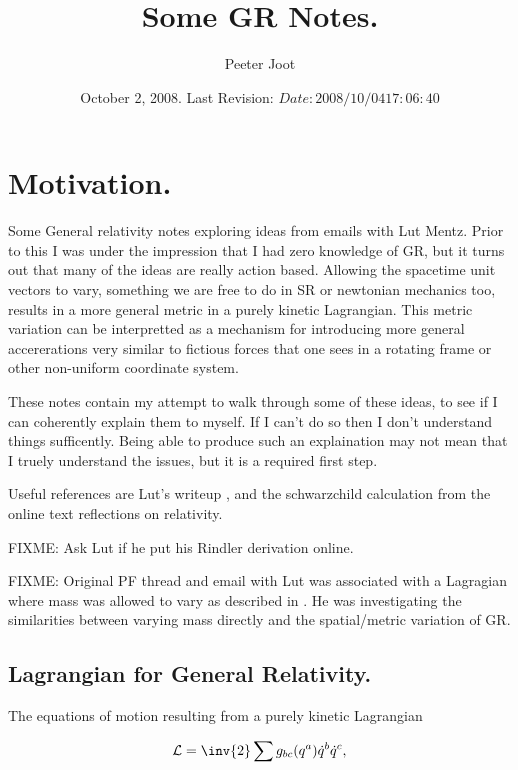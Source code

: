 \documentclass{article}      %
\title{ Some GR Notes. } %
\author{Peeter Joot}         %
\date{ October 2, 2008.  Last Revision: $Date: 2008/10/04 17:06:40 $ } %
\newcommand{\LL}[0]{\mathcal{L}}
\newcommand{\qdot}[0]{\dot{q}}
\begin{document}

\maketitle{}

\tableofcontents

\section{ Motivation. }

Some General relativity notes exploring ideas from emails with Lut Mentz.
Prior to this I was under the impression that I had zero knowledge of GR,
but it turns out that many of the ideas are really action based. 
Allowing the spacetime unit vectors to vary, something we are free to
do in SR or newtonian mechanics too, results in a more 
general metric in a purely kinetic Lagrangian.  This metric variation
can be interpretted as a mechanism for introducing more general
accererations very similar to fictious forces that one sees in a
rotating frame or other non-uniform coordinate system.

These notes contain my attempt to walk through some of these ideas, to see
if I can coherently explain them to myself.  If I can't do so then I don't
understand things sufficently.  Being able to produce such an explaination
may not mean that I truely understand the issues, but it is a required
first step.

Useful references are Lut's writeup \cite{lutSchwarzChildRadial}, 
and the schwarzchild calculation \cite{mathpagesSchwarzChildRadial}
from the online text reflections on relativity.

FIXME: Ask Lut if he put his Rindler derivation online.

FIXME: Original PF thread and email with Lut was associated with 
a Lagragian where mass was allowed to vary as described in \cite{PJMassVary}.  He was
investigating the similarities between varying mass directly and the spatial/metric
variation of GR.

\subsection{ Lagrangian for General Relativity. }

The equations of motion resulting from a purely kinetic Lagrangian

\begin{equation}\label{eqn:keLagrangian}
\LL = \inv{2} \sum  g_{b c}(q^a) \qdot^b \qdot^c,
\end{equation}
\end{document}
